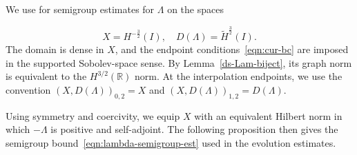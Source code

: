 \documentclass[11pt,reqno]{amsart}
\theoremstyle{plain}
\theoremstyle{definition}
\numberwithin{equation}{section}
\newcommand{\wt}[1]{\widetilde{#1}}
\newcommand{\R}{\mathbb{R}}
\newcommand{\hi}[1]{H^{#1}(I)}
\newcommand{\thi}[1]{\wt H^{#1}(I)}
\begin{document}
We use \cite[Chapter~2]{Lunardi1995} for semigroup estimates for
$\Lambda$ on the spaces

\begin{equation}
    X=\hi{-\frac32},
    \quad D(\Lambda)=\thi{\frac32}.
\end{equation}
The domain is dense in $X$, and the endpoint conditions~\eqref{eqn:cur-bc}
are imposed in the supported Sobolev-space sense. By Lemma~\ref{ds-Lam-biject},
its graph norm is equivalent to the $H^{3/2}(\R)$ norm.
At the interpolation endpoints, we use the convention
$(X,D(\Lambda))_{0,2}=X$ and
$(X,D(\Lambda))_{1,2}=D(\Lambda)$.

Using symmetry and coercivity, we equip $X$ with an equivalent Hilbert
norm in which $-\Lambda$ is positive and self-adjoint. The following
proposition then gives the semigroup bound~\eqref{eqn:lambda-semigroup-est}
used in the evolution estimates.
\end{document}
